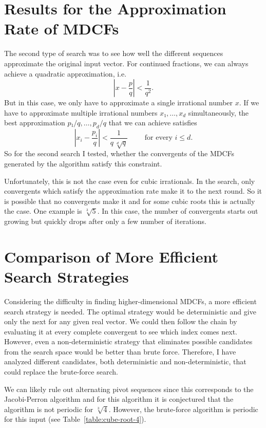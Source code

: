 \section{Results for the Approximation Rate of MDCFs}

The second type of search was to see how well the different sequences
approximate the original input vector.
For continued fractions, we can always achieve a quadratic approximation, i.e.
\[
  \left| x - \frac{p}{q} \right| < \frac{1}{q^2}.
\]
But in this case, we only have to approximate a single irrational number $x$.
If we have to approximate multiple irrational numbers $x₁, …, x_d$ simultaneously,
the best approximation $p₁/q, …, p_d/q$ that we can achieve satisfies
\[
  \left|x_i - \frac{p_i}{q}\right| < \frac{1}{q \, \sqrt[d]{q}} \qquad \text{ for every } i ≤ d.
\]
So for the second search I tested, whether the convergents of the MDCFs
generated by the algorithm satisfy this constraint.

Unfortunately, this is not the case even for cubic irrationals.
In the search, only convergents which satisfy the approximation rate make it to the next round.
So it is possible that no convergents make it
and for some cubic roots this is actually the case.
One example is $\sqrt[3]{5}$.
In this case, the number of convergents starts out growing but quickly drops
after only a few number of iterations.



\section{Comparison of More Efficient Search Strategies}

Considering the difficulty in finding higher-dimensional MDCFs,
a more efficient search strategy is needed.
The optimal strategy would be deterministic
and give only the next for any given real vector.
We could then follow the chain by evaluating it at every complete convergent to
see which index comes next.
However, even a non-deterministic strategy that eliminates possible candidates
from the search space would be better than brute force.
Therefore, I have analyzed different candidates, both deterministic and
non-deterministic, that could replace the brute-force search.

We can likely rule out alternating pivot sequences since this corresponds to
the Jacobi-Perron algorithm and for this algorithm it is conjectured
\cite{Karpenkov21} that the algorithm is not periodic for $\sqrt[3]{4}$.
However, the brute-force algorithm is periodic for this input (see Table~\ref{table:cube-root-4}).
